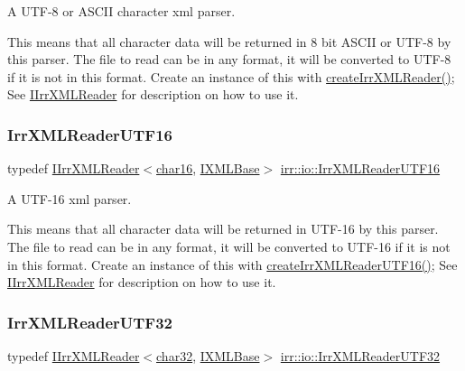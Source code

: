 A U\+T\+F-\/8 or A\+S\+C\+II character xml parser. 

This means that all character data will be returned in 8 bit A\+S\+C\+II or U\+T\+F-\/8 by this parser. The file to read can be in any format, it will be converted to U\+T\+F-\/8 if it is not in this format. Create an instance of this with \hyperlink{namespaceirr_1_1io_a581f4d4648398759c61266d63d7106b1}{create\+Irr\+X\+M\+L\+Reader()}; See \hyperlink{classirr_1_1io_1_1IIrrXMLReader}{I\+Irr\+X\+M\+L\+Reader} for description on how to use it. \mbox{\label{namespaceirr_1_1io_a5eb4094dfd0d509e0cd8a9d1dd30a5b9}} 
\subsubsection{\texorpdfstring{Irr\+X\+M\+L\+Reader\+U\+T\+F16}{IrrXMLReaderUTF16}}
{\footnotesize\ttfamily typedef \hyperlink{classirr_1_1io_1_1IIrrXMLReader}{I\+Irr\+X\+M\+L\+Reader}$<$\hyperlink{namespaceirr_1_1io_a9140fe380f1a4e2fb4e114463e2d2838}{char16}, \hyperlink{classirr_1_1io_1_1IXMLBase}{I\+X\+M\+L\+Base}$>$ \hyperlink{namespaceirr_1_1io_a5eb4094dfd0d509e0cd8a9d1dd30a5b9}{irr\+::io\+::\+Irr\+X\+M\+L\+Reader\+U\+T\+F16}}



A U\+T\+F-\/16 xml parser. 

This means that all character data will be returned in U\+T\+F-\/16 by this parser. The file to read can be in any format, it will be converted to U\+T\+F-\/16 if it is not in this format. Create an instance of this with \hyperlink{namespaceirr_1_1io_a86473ef152c15b685af181a4c5461a5d}{create\+Irr\+X\+M\+L\+Reader\+U\+T\+F16()}; See \hyperlink{classirr_1_1io_1_1IIrrXMLReader}{I\+Irr\+X\+M\+L\+Reader} for description on how to use it. \mbox{\label{namespaceirr_1_1io_a70f411ff403636fb5c4e9becb090d5ec}} 
\subsubsection{\texorpdfstring{Irr\+X\+M\+L\+Reader\+U\+T\+F32}{IrrXMLReaderUTF32}}
{\footnotesize\ttfamily typedef \hyperlink{classirr_1_1io_1_1IIrrXMLReader}{I\+Irr\+X\+M\+L\+Reader}$<$\hyperlink{namespaceirr_1_1io_adfbb5748d02235670728f95ab89b69a4}{char32}, \hyperlink{classirr_1_1io_1_1IXMLBase}{I\+X\+M\+L\+Base}$>$ \hyperlink{namespaceirr_1_1io_a70f411ff403636fb5c4e9becb090d5ec}{irr\+::io\+::\+Irr\+X\+M\+L\+Reader\+U\+T\+F32}}



